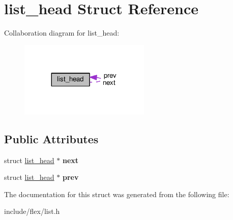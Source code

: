 \hypertarget{structlist__head}{}\section{list\+\_\+head Struct Reference}
\label{structlist__head}


Collaboration diagram for list\+\_\+head\+:\nopagebreak
\begin{figure}[H]
\begin{center}
\leavevmode
\includegraphics[width=176pt]{structlist__head__coll__graph}
\end{center}
\end{figure}
\subsection*{Public Attributes}
\begin{DoxyCompactItemize}
\item 
struct \hyperlink{structlist__head}{list\+\_\+head} $\ast$ {\bfseries next}\hypertarget{structlist__head_a44b2d28c78f7266869b3f00390bec772}{}\label{structlist__head_a44b2d28c78f7266869b3f00390bec772}

\item 
struct \hyperlink{structlist__head}{list\+\_\+head} $\ast$ {\bfseries prev}\hypertarget{structlist__head_aaa0eabda8877e1d6de73a33f223ad004}{}\label{structlist__head_aaa0eabda8877e1d6de73a33f223ad004}

\end{DoxyCompactItemize}


The documentation for this struct was generated from the following file\+:\begin{DoxyCompactItemize}
\item 
include/flex/list.\+h\end{DoxyCompactItemize}
